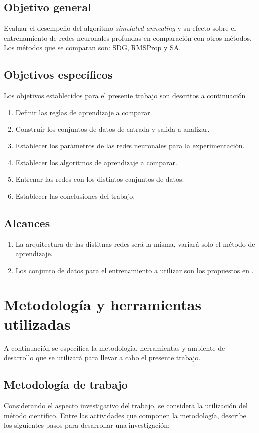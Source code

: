 \subsection{Objetivo general}
Evaluar el desempeño del algoritmo {\em simulated annealing} y su efecto sobre el entrenamiento de redes neuronales profundas en comparación con otros métodos. Los métodos que se comparan son: SDG, RMSProp y SA.

\subsection{Objetivos específicos}
Los objetivos establecidos para el presente trabajo son descritos a continuación
\begin{enumerate}
	\item Definir las reglas de aprendizaje a comparar.
	\item Construir los conjuntos de datos de entrada y salida a analizar.
	\item Establecer los parámetros de las redes neuronales para la experimentación.
	\item Establecer los algoritmos de aprendizaje a comparar.
	\item Entrenar las redes con los distintos conjuntos de datos.
	\item Establecer las conclusiones del trabajo.
\end{enumerate}

\subsection{Alcances}
\begin{enumerate}
	\item La arquitectura de las distitnas redes será la misma, variará solo el método de aprendizaje.
	\item Los conjunto de datos para el entrenamiento a utilizar son los propuestos en \cite{Morse2016}.
\end{enumerate}

\section{Metodología y herramientas utilizadas}
A continuación se especifica la metodología, herramientas y ambiente de desarrollo que se utilizará para llevar a cabo el presente trabajo.

\subsection{Metodología de trabajo}
Considerando el aspecto investigativo del trabajo, se considera la utilización del método científico. Entre las actividades que componen la metodología,  describe los siguientes pasos para desarrollar una investigación:


